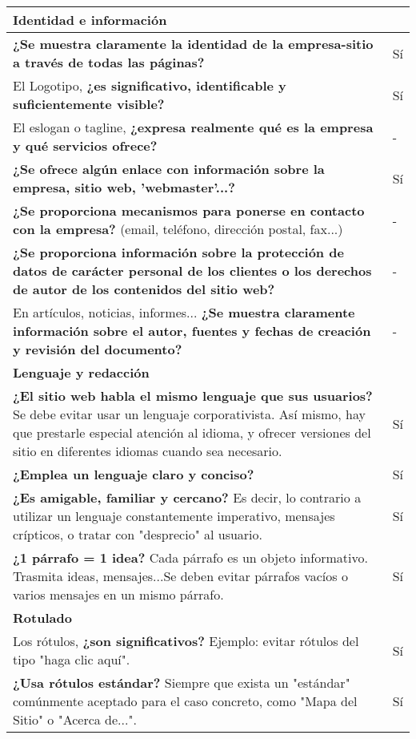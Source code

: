 \begin{longtable}[H]{p{31em}|p{5em}}
\multicolumn{2}{p{36em}}{\cellcolor[rgb]{ .851,  .886,  .953} \textbf{Identidad e información}} \\ \hline
\textbf{¿Se muestra claramente la identidad de la empresa-sitio a través de todas las páginas?} & Sí \\ \hline
El Logotipo, \textbf{¿es significativo, identificable y suficientemente visible?} & Sí \\ \hline
El eslogan o tagline, \textbf{¿expresa realmente qué es la empresa y qué servicios ofrece?} & - \\ \hline
\textbf{¿Se ofrece algún enlace con información sobre la empresa, sitio web, 'webmaster’...? } & Sí \\ \hline
\textbf{¿Se proporciona mecanismos para ponerse en contacto con la empresa?} (email, teléfono, dirección postal, fax...) & - \\ \hline
\textbf{¿Se proporciona información sobre la protección de datos de carácter personal de los clientes o los derechos de autor de los contenidos del sitio web?} & - \\ \hline
En artículos, noticias, informes... \textbf{¿Se muestra claramente información sobre el autor, fuentes y fechas de creación y revisión del documento? } & - \\ \hline
\multicolumn{2}{p{36em}}{\cellcolor[rgb]{ .851,  .886,  .953} \textbf{Lenguaje y redacción}} \\ \hline
\textbf{¿El sitio web habla el mismo lenguaje que sus usuarios?} Se debe evitar usar un lenguaje corporativista. Así mismo, hay que prestarle especial atención al idioma, y ofrecer versiones del sitio en diferentes idiomas cuando sea necesario. & Sí \\ \hline
\textbf{¿Emplea un lenguaje claro y conciso?} & Sí \\ \hline
\textbf{¿Es amigable, familiar y cercano?} Es decir, lo contrario a utilizar un lenguaje constantemente imperativo, mensajes crípticos, o tratar con "desprecio" al usuario. & Sí \\ \hline
\textbf{¿1 párrafo = 1 idea?} Cada párrafo es un objeto informativo. Trasmita ideas, mensajes...Se deben evitar párrafos vacíos o varios mensajes en un mismo párrafo. & Sí \\ \hline
\multicolumn{2}{p{36em}}{\cellcolor[rgb]{ .851,  .886,  .953} \textbf{Rotulado}} \\ \hline
Los rótulos, \textbf{¿son significativos?} Ejemplo: evitar rótulos del tipo "haga clic aquí". & Sí \\ \hline
\textbf{¿Usa rótulos estándar?} Siempre que exista un "estándar" comúnmente aceptado para el caso concreto, como "Mapa del Sitio" o "Acerca de...". & Sí \\ \hline

\end{longtable}
